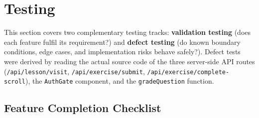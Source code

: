 \section{Testing}

This section covers two complementary testing tracks: \textbf{validation testing} (does each feature fulfil its requirement?) and \textbf{defect testing} (do known boundary conditions, edge cases, and implementation risks behave safely?). Defect tests were derived by reading the actual source code of the three server-side API routes (\texttt{/api/lesson/visit}, \texttt{/api/exercise/submit}, \texttt{/api/exercise/complete-scroll}), the \texttt{AuthGate} component, and the \texttt{gradeQuestion} function.

\subsection{Feature Completion Checklist}

